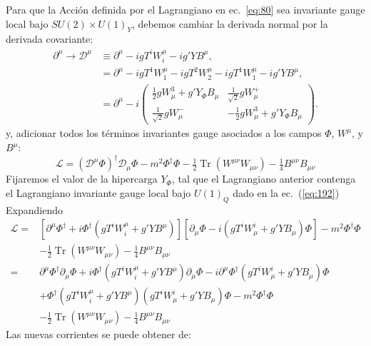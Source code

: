 Para que la Acci\'on definida por el Lagrangiano en ec.~\eqref{eq:80} sea invariante gauge local bajo $SU(2)\times U(1)_Y$, debemos cambiar la derivada normal por la derivada covariante:
\begin{align}
\partial^\mu\to\mathcal{D}^\mu&\equiv\partial^\mu-igT^iW^\mu_i-ig'YB^\mu,\nonumber\\
&=\partial^\mu-igT^1W^\mu_1-igT^2W^\mu_2-igT^1W^\mu_1-ig'YB^\mu,\nonumber\\
&=\label{eq:120}
\partial^\mu-i  \begin{pmatrix}
    \frac{1}{2}gW^3_\mu+g'Y_\Phi B_\mu&\frac{1}{\sqrt{2}}gW^+_\mu\\
    \frac{1}{\sqrt{2}}gW^-_\mu&-\frac{1}{2}gW^3_\mu+g'Y_\Phi B_\mu
  \end{pmatrix}.
\end{align}
y, adicionar todos los t\'erminos invariantes gauge asociados a los campos $\Phi$, $W^\mu$, y $B^\mu$:
\begin{equation}
  \label{eq:91}
  \mathcal{L}=\left(\mathcal{D}^\mu\Phi\right)^\dagger\mathcal{D}_\mu\Phi-m^2\Phi^\dagger \Phi-\tfrac{1}{2}\operatorname{Tr}\left(W^{\mu\nu}W_{\mu\nu}\right)-\tfrac{1}{4}B^{\mu\nu}B_{\mu\nu}
\end{equation}
Fijaremos el valor de la hipercarga $Y_\Phi$, tal que el Lagrangiano anterior contenga el Lagrangiano invariante gauge local bajo $U(1)_Q$ dado en la ec.~(\ref{eq:192})
Expandiendo
\begin{align}
  \label{eq:188}
  \mathcal{L}=&[\partial^\mu\Phi^\dagger+i\Phi^\dagger(gT^iW^\mu_i+g'YB^\mu)][\partial_\mu\Phi-i(gT^iW_\mu^i+g'YB_\mu)\Phi]
  -m^2\Phi^\dagger \Phi\nonumber\\
  &-\tfrac{1}{2}\operatorname{Tr}\left(W^{\mu\nu}W_{\mu\nu}\right)-\tfrac{1}{4}B^{\mu\nu}B_{\mu\nu}\nonumber\\
  =&\partial^\mu\Phi^\dagger\partial_\mu\Phi+i\Phi^\dagger(gT^iW^\mu_i+g'YB^\mu)\partial_\mu\Phi-i\partial^\mu\Phi^\dagger(gT^iW_\mu^i+g'YB_\mu)\Phi\nonumber\\
&+\Phi^\dagger(gT^iW^\mu_i+g'YB^\mu)(gT^iW_\mu^i+g'YB_\mu)\Phi -m^2\Phi^\dagger \Phi\nonumber\\
  &-\tfrac{1}{2}\operatorname{Tr}\left(W^{\mu\nu}W_{\mu\nu}\right)-\tfrac{1}{4}B^{\mu\nu}B_{\mu\nu}
 \end{align}
Las nuevas corrientes se puede obtener de:
